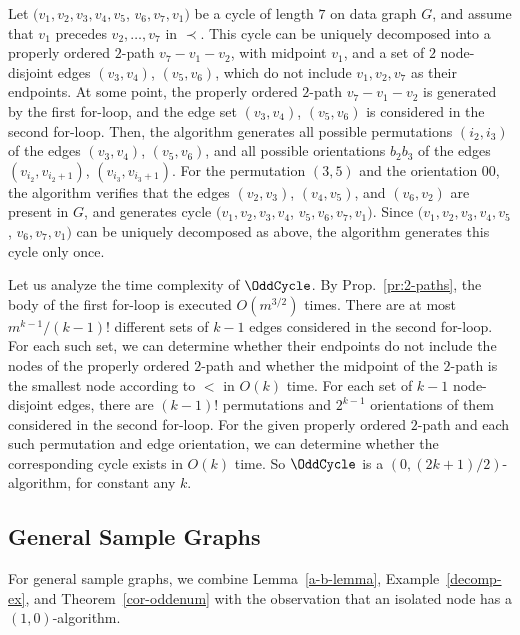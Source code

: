 \begin{example}
Let $(v_1, v_2, v_3, v_4, v_5$, $v_6, v_7, v_1)$ be a cycle of length $7$ on data graph $G$, and assume that $v_1$ precedes $v_2, \ldots, v_7$ in $\prec$. This cycle can be uniquely decomposed into a properly ordered $2$-path $v_7 - v_1 - v_2$, with midpoint $v_1$, and a set of $2$ node-disjoint edges $(v_3, v_4)$, $(v_5, v_6)$, which do not include $v_1, v_2, v_7$ as their endpoints.
At some point, the properly ordered $2$-path $v_7 - v_1 - v_2$ is generated by the first for-loop, and the edge set $(v_3, v_4)$, $(v_5, v_6)$ is considered in the second for-loop.
Then, the algorithm generates all possible permutations $(i_2, i_3)$ of the edges $(v_3, v_4)$, $(v_5, v_6)$, and all possible orientations $b_2b_3$ of the edges $(v_{i_2}, v_{i_2+1})$, $(v_{i_3}, v_{i_3+1})$.
For the permutation $(3, 5)$ and the orientation $00$, the algorithm verifies that the edges $(v_2, v_3)$, $(v_4, v_5)$, and $(v_6, v_2)$ are present in $G$, and generates cycle $(v_1, v_2, v_3, v_4$, $v_5, v_6, v_7, v_1)$.
Since $(v_1, v_2, v_3, v_4, v_5$, $v_6, v_7, v_1)$ can be uniquely decomposed as above, the algorithm generates this cycle only once.
\end{example}

Let us analyze the time complexity of $\OddCycle$.  By Prop.~\ref{pr:2-paths}, the body of the first for-loop is executed $O(m^{3/2})$ times. There are at most $m^{k-1}/(k-1)!$ different sets of $k-1$ edges considered in the second for-loop. For each such set, we can determine whether their endpoints do not include the nodes of the properly ordered $2$-path and whether the midpoint of the $2$-path is the smallest node according to $<$ in $O(k)$ time. For each set of $k-1$ node-disjoint edges, there are $(k-1)!$ permutations and $2^{k-1}$ orientations of them considered in the second for-loop. For the given properly ordered $2$-path and each such permutation and edge orientation, we can determine whether the corresponding cycle exists in $O(k)$ time. So $\OddCycle$ is a $(0, (2k+1)/2)$-algorithm, for constant any $k$.



\subsection{General Sample Graphs}

For general sample graphs, we combine  Lemma~\ref{a-b-lemma}, Example~\ref{decomp-ex}, and Theorem~\ref{cor-oddenum} with the observation that an isolated node has a $(1,0)$-algorithm.

